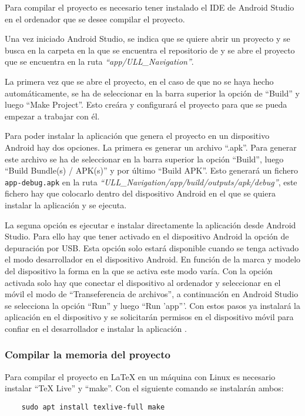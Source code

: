 Para compilar el proyecto es necesario tener instalado el IDE de Android Studio en el ordenador que se desee compilar el proyecto.

Una vez iniciado Android Studio, se indica que se quiere abrir un proyecto y se busca en la carpeta en la que se encuentra el repositorio de \ULLAR{} y se abre el proyecto que se encuentra en la ruta \textit{``app/ULL\_Navigation''}. 

La primera vez que se abre el proyecto, en el caso de que no se haya hecho automáticamente, se ha de seleccionar en la barra superior la opción de ``Build'' y luego ``Make Project''. 
Esto creára y configurará el proyecto para que se pueda empezar a trabajar con él.

Para poder instalar la aplicación que genera el proyecto en un dispositivo Android hay dos opciones. 
La primera es generar un archivo ``.apk''. Para generar este archivo se ha de seleccionar en la barra superior la opción ``Build'', luego ``Build Bundle(s) / APK(s)'' y por último ``Build APK''. 
Esto generará un fichero \texttt{app-debug.apk} en la ruta \textit{``ULL\_Navigation/app/build/outputs/apk/debug''}, este fichero hay que colocarlo dentro del dispositivo Android en el que se quiera instalar la aplicación y se ejecuta.

La seguna opción es ejecutar e instalar directamente la aplicación desde Android Studio. 
Para ello hay que tener activado en el dispositivo Android la opción de depuración por USB. 
Esta opción solo estará disponible cuando se tenga activado el modo desarrollador en el dispositivo Android. 
En función de la marca y modelo del dispositivo la forma en la que se activa este modo varía. 
Con la opción activada solo hay que conectar el dispositivo al ordenador y seleccionar en el móvil el modo de ``Transeferencia de archivos'', a continuación en Android Studio se selecciona la opción ``Run'' y luego ``Run 'app'''. 
Con estos pasos ya instalará la aplicación en el dispositivo y se solicitarán permisos en el dispositivo móvil para confiar en el desarrollador e instalar la aplicación \ULLAR{}. 


\subsubsection{Compilar la memoria del proyecto}
Para compilar el proyecto en LaTeX en un máquina con Linux es necesario instalar ``TeX Live'' y ``make''. Con el siguiente comando se instalarán ambos:
\begin{lstlisting}
    sudo apt install texlive-full make 
\end{lstlisting}

